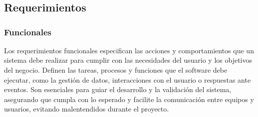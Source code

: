\documentclass[12pt]{article} %
\begin{document}
\section*{}

\subsection*{Requerimientos}

\subsubsection*{Funcionales}

Los requerimientos funcionales especifican las acciones y comportamientos que un sistema debe realizar para cumplir con las necesidades del usuario y los objetivos del negocio. Definen las tareas, procesos y funciones que el software debe ejecutar, como la gestión de datos, interacciones con el usuario o respuestas ante eventos. Son esenciales para guiar el desarrollo y la validación del sistema, asegurando que cumpla con lo esperado y facilite la comunicación entre equipos y usuarios, evitando malentendidos durante el proyecto.

\thispagestyle{plain}
  \footnotesize %
  \renewcommand{\arraystretch}{3} %
  
\end{document}
